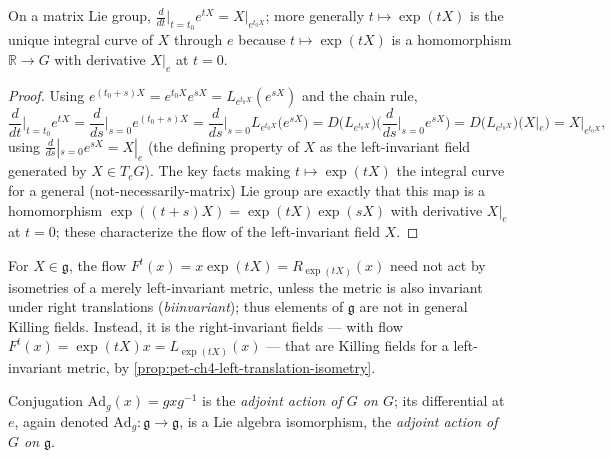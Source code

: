 \begin{proposition}
  \label{prop:pet-ch4-matrix-exp-integral-curve}
  \leanok
  On a matrix Lie group, $\tfrac{d}{dt}\big|_{t=t_0}e^{tX}=X|_{e^{t_0X}}$; more
  generally $t\mapsto\exp(tX)$ is the unique integral curve of $X$ through $e$
  because $t\mapsto\exp(tX)$ is a homomorphism $\mathbb{R}\to G$ with derivative
  $X|_e$ at $t=0$.
\end{proposition}
\begin{proof}
  \leanok
  Using $e^{(t_0+s)X}=e^{t_0X}e^{sX}=L_{e^{t_0X}}(e^{sX})$ and the chain rule,
  \[
    \frac{d}{dt}\Big|_{t=t_0}e^{tX}=\frac{d}{ds}\Big|_{s=0}e^{(t_0+s)X}
    =\frac{d}{ds}\Big|_{s=0}L_{e^{t_0X}}\big(e^{sX}\big)
    =D\big(L_{e^{t_0X}}\big)\Big(\frac{d}{ds}\Big|_{s=0}e^{sX}\Big)
    =D\big(L_{e^{t_0X}}\big)(X|_e)=X|_{e^{t_0X}},
  \]
  using $\tfrac{d}{ds}|_{s=0}e^{sX}=X|_e$ (the defining property of $X$ as the
  left-invariant field generated by $X\in T_eG$). The key facts making
  $t\mapsto\exp(tX)$ the integral curve for a general (not-necessarily-matrix)
  Lie group are exactly that this map is a homomorphism
  $\exp((t+s)X)=\exp(tX)\exp(sX)$ with derivative $X|_e$ at $t=0$; these
  characterize the flow of the left-invariant field $X$.
\end{proof}

\begin{remark}
  \label{rem:pet-ch4-flow-right-invariant-killing}
  For $X\in\mathfrak g$, the flow $F^t(x)=x\exp(tX)=R_{\exp(tX)}(x)$ need not
  act by isometries of a merely left-invariant metric, unless the metric is
  also invariant under right translations (\emph{biinvariant}); thus elements
  of $\mathfrak g$ are not in general Killing fields. Instead, it is the
  right-invariant fields — with flow
  $F^t(x)=\exp(tX)x=L_{\exp(tX)}(x)$ — that are Killing fields for a
  left-invariant metric, by \cref{prop:pet-ch4-left-translation-isometry}.
\end{remark}

\begin{definition}
  \label{def:pet-ch4-adjoint-action}
  \leanok
  Conjugation $\mathrm{Ad}_g(x)=gxg^{-1}$ is the \emph{adjoint action of $G$ on
  $G$}; its differential at $e$, again denoted $\mathrm{Ad}_g:\mathfrak g\to\mathfrak g$,
  is a Lie algebra isomorphism, the \emph{adjoint action of $G$ on $\mathfrak g$}.
\end{definition}

